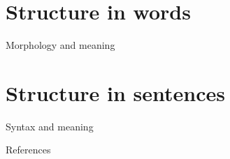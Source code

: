 \documentclass{beamer}
\begin{document}
\section{Structure in words}

\begin{frame}{Morphology and meaning}

\end{frame}

\section{Structure in sentences}

\begin{frame}{Syntax and meaning}

\end{frame}



\begin{frame}{References}


\end{frame}
\end{document}
